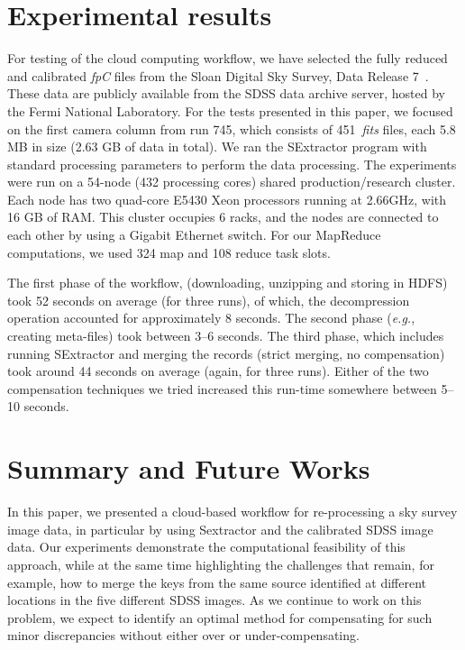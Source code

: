 \documentclass[11pt,twoside]{article}
\begin{document}
{\section{Experimental results}
For testing of the cloud computing workflow, we have selected the fully reduced and calibrated \textit{fpC} files from the Sloan Digital Sky Survey, Data Release 7~\citep{sdssdr7}. These data are publicly available from the SDSS data archive server, hosted by the Fermi National Laboratory. For the tests presented in this paper, we focused on the first camera column from run 745, which consists of 451~\textit{fits} files, each 5.8 MB in size (2.63 GB of data in total). 
We ran the SExtractor program with standard processing parameters to perform the data processing.
The experiments were run on a 54-node (432 processing cores) shared production/research cluster. Each node has two quad-core E5430 Xeon processors running at 2.66GHz, with 16 GB of RAM. This cluster occupies 6 racks, and the nodes are connected to each other by using a Gigabit Ethernet switch. For our MapReduce computations, we used 324 map and 108 reduce task slots.

The first phase of the workflow, (downloading, unzipping and storing in HDFS) took 52 seconds on average (for three runs), of which, the decompression operation accounted for approximately 8 seconds.  
The second phase (\textit{e.g.}, creating meta-files) took between 3--6 seconds. The third phase, which includes running SExtractor and merging the records (strict merging, no compensation) took around 44 seconds on average (again, for three runs). Either of the two compensation techniques we tried increased this run-time somewhere between 5--10 seconds.

\section{Summary and Future Works}

In this paper, we presented a cloud-based workflow for re-processing a sky survey image data, in particular by using Sextractor and the calibrated SDSS image data. Our experiments demonstrate the computational feasibility of this approach, while at the same time highlighting the challenges that remain, for example, how to merge the keys from the same source identified at different locations in the five different SDSS images. As we continue to work on this problem, we expect to identify an optimal method for compensating for such minor discrepancies without either over or under-compensating.

}
\end{document}
